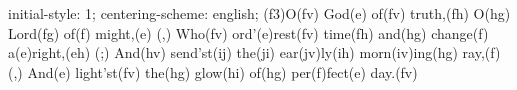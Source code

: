 initial-style: 1;
centering-scheme: english;
(f3)O(fv) God(e) of(fv) truth,(fh) O(hg) Lord(fg) of(f) might,(e) (,)
Who(fv) ord'(e)rest(fv) time(fh) and(hg) change(f) a(e)right,(eh) (;)
And(hv) send'st(ij) the(ji) ear(jv)ly(ih) morn(iv)ing(hg) ray,(f) (,)
And(e) light'st(fv) the(hg) glow(hi) of(hg) per(f)fect(e) day.(fv)
